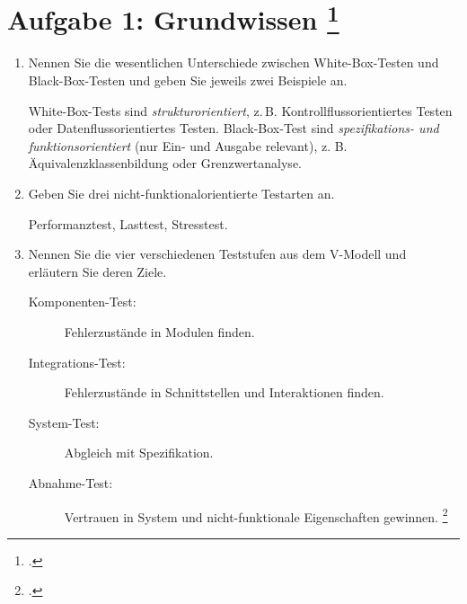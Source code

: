 \documentclass{lehramt-informatik-aufgabe}
\begin{document}

\section{Aufgabe 1: Grundwissen
\footcite{sosy:ab:7}}

\begin{enumerate}


\item Nennen Sie die wesentlichen Unterschiede zwischen White-Box-Testen
und Black-Box-Testen und geben Sie jeweils zwei Beispiele an.

\begin{antwort}
White-Box-Tests sind \emph{strukturorientiert}, z.\,B.
Kontrollflussorientiertes Testen oder Datenflussorientiertes Testen.
Black-Box-Test sind \emph{spe\-zifi\-kations- und funktionsorientiert} (nur
Ein- und Ausgabe relevant), z. B. Äquivalenzklassenbildung oder
Grenzwertanalyse.
\end{antwort}


\item Geben Sie drei nicht-funktionalorientierte Testarten an.

\begin{antwort}
Performanztest, Lasttest, Stresstest.
\end{antwort}


\item Nennen Sie die vier verschiedenen Teststufen aus dem
V-Modell und erläutern Sie deren Ziele.

\begin{antwort}
\begin{description}
\item[Komponenten-Test:]
Fehlerzustände in Modulen finden.

\item[Integrations-Test:]
Fehlerzustände in Schnittstellen und Interaktionen finden.

\item[System-Test:]
Abgleich mit Spezifikation.

\item[Abnahme-Test:]
Vertrauen in System und nicht-funktionale Eigenschaften gewinnen.
\footcite[Seite 50, Abbildung 3.2]{schatten}
\end{description}
\end{antwort}


\end{enumerate}
\end{document}
